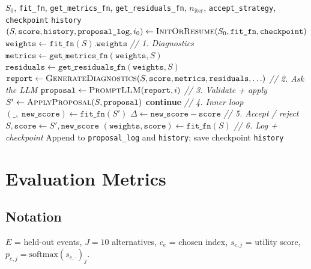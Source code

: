 \documentclass[11pt,a4paper]{article}
\begin{document}
\begin{algorithm}[H]
\caption{\textsc{RunStructureDescent}}\label{alg:outer-loop}
\begin{algorithmic}[1]
\Require $S_0$, \texttt{fit\_fn}, \texttt{get\_metrics\_fn}, \texttt{get\_residuals\_fn}, $n_{\text{iter}}$, \texttt{accept\_strategy}, \texttt{checkpoint}
\Ensure \texttt{history}
\State $(S, \texttt{score}, \texttt{history}, \texttt{proposal\_log}, i_0) \gets \Call{InitOrResume}{S_0, \texttt{fit\_fn}, \texttt{checkpoint}}$
\State $\texttt{weights} \gets \texttt{fit\_fn}(S).\texttt{weights}$
    \Statex \textit{// 1. Diagnostics}
    \State $\texttt{metrics} \gets \texttt{get\_metrics\_fn}(\texttt{weights}, S)$
    \State $\texttt{residuals} \gets \texttt{get\_residuals\_fn}(\texttt{weights}, S)$
    \State $\texttt{report} \gets \Call{GenerateDiagnostics}{S, \texttt{score}, \texttt{metrics}, \texttt{residuals}, \ldots}$
    \Statex \textit{// 2. Ask the LLM}
    \State $\texttt{proposal} \gets \Call{PromptLLM}{\texttt{report}, i}$ 
    \Statex \textit{// 3. Validate + apply}
    \State $S' \gets \Call{ApplyProposal}{S, \texttt{proposal}}$
     \textbf{continue} \EndIf
    \Statex \textit{// 4. Inner loop}
    \State $(\_,\; \texttt{new\_score}) \gets \texttt{fit\_fn}(S')$
    \State $\Delta \gets \texttt{new\_score} - \texttt{score}$
    \Statex \textit{// 5. Accept / reject}
        \State $S, \texttt{score} \gets S', \texttt{new\_score}$
        \State $(\texttt{weights}, \texttt{score}) \gets \texttt{fit\_fn}(S)$
    \EndIf
    \Statex \textit{// 6. Log + checkpoint}
    \State Append to \texttt{proposal\_log} and \texttt{history}; save checkpoint
\EndFor
\State \Return \texttt{history}
\end{algorithmic}
\end{algorithm}


\section{Evaluation Metrics}
\label{sec:eval}

\subsection{Notation}
$E$ = held-out events, $J = 10$ alternatives, $c_e$ = chosen index, $s_{e,j}$ = utility score, $p_{e,j} = \text{softmax}(s_{e,\cdot})_j$.
\end{document}
